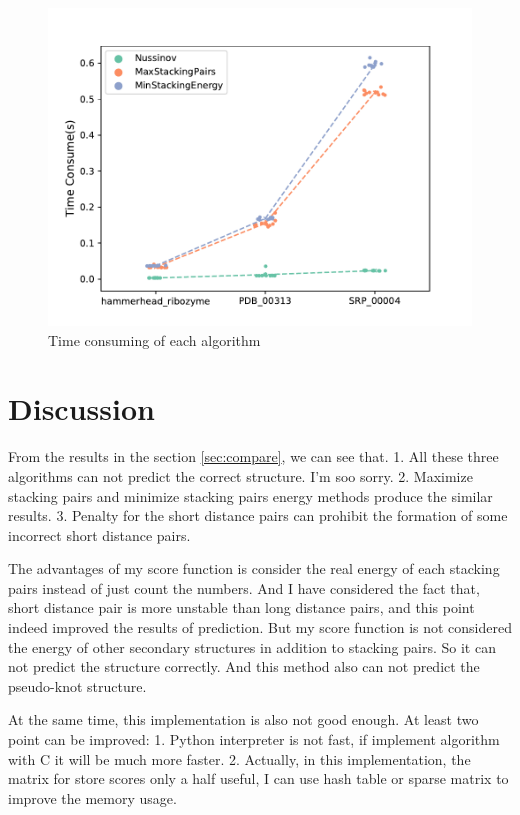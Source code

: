 \documentclass[10pt]{article}
\begin{document}
\begin{figure}[h]
    \includegraphics[width=\linewidth]{./img/time_consume.pdf}
    \caption{Time consuming of each algorithm}
    \label{fig:time_consuming}
\end{figure}

\section{Discussion}
\label{discussion}

From the results in the section \ref{sec:compare},
we can see that. 1. All these three algorithms can not predict the correct structure. I'm soo sorry.
2. Maximize stacking pairs and minimize stacking pairs energy methods produce the similar results.
3. Penalty for the short distance pairs can prohibit the formation of some incorrect short distance pairs.

The advantages of my score function is consider the real energy of each stacking pairs 
instead of just count the numbers. And I have considered the fact that, 
short distance pair is more unstable than long distance pairs, and this point indeed improved the results of prediction.
But my score function is not considered the energy of other secondary structures in addition to stacking pairs.
So it can not predict the structure correctly. And this method also can not predict the pseudo-knot structure.

At the same time, this implementation is also not good enough. At least two point can be improved: 
1. Python interpreter is not fast, if implement algorithm with C it will be much more faster.
2. Actually, in this implementation, the matrix for store scores only a half useful,
I can use hash table or sparse matrix to improve the memory usage.
\end{document}
